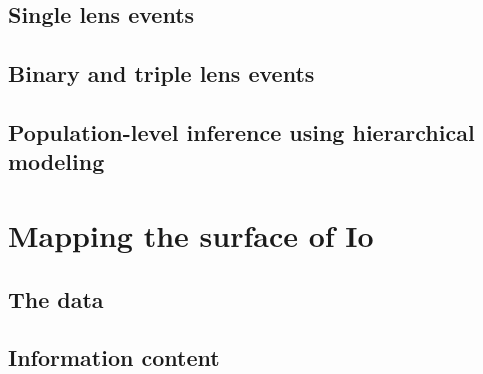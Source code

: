 \documentclass[12pt,dvipsnames]{report}
\begin{document}
\section{Single lens events}
%
%

\section{Binary and triple lens events}
\section{Population-level inference using hierarchical modeling}

\chapter{Mapping the surface of Io}
\label{ch:mapping_io}
\section{The data}
\section{Information content}
\end{document}
